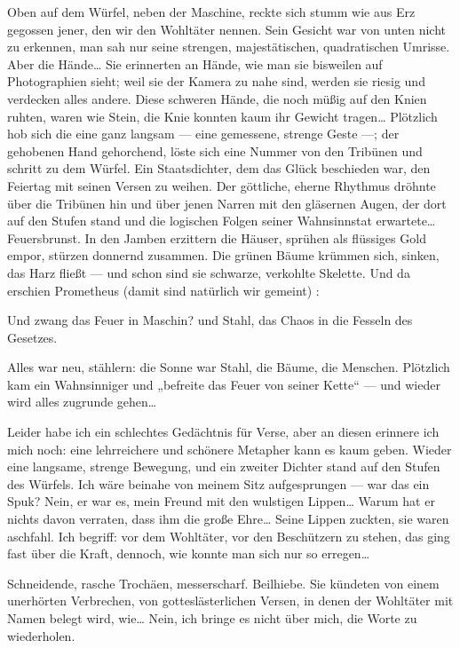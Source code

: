 Oben auf dem Würfel, neben der Maschine, reckte sich stumm wie aus
Erz gegossen jener, den wir den Wohltäter nennen. Sein Gesicht war
von unten nicht zu erkennen, man sah nur seine strengen,
majestätischen, quadratischen Umrisse. Aber die Hände\ldots{} Sie
erinnerten an Hände, wie man sie bisweilen auf Photographien sieht;
weil sie der Kamera zu nahe sind, werden sie riesig und verdecken
alles andere. Diese schweren Hände, die noch müßig auf den Knien
ruhten, waren wie Stein, die Knie konnten kaum ihr Gewicht
tragen\ldots{} Plötzlich hob sich die eine ganz langsam — eine
gemessene, strenge Geste —; der gehobenen Hand gehorchend, löste
sich eine Nummer von den Tribünen und schritt zu dem Würfel. Ein
Staatsdichter, dem das Glück beschieden war, den Feiertag mit
seinen Versen zu weihen. Der göttliche, eherne Rhythmus dröhnte
über die Tribünen hin und über jenen Narren mit den gläsernen
Augen, der dort auf den Stufen stand und die logischen Folgen
seiner Wahnsinnstat erwartete\ldots{} Feuersbrunst. In den Jamben
erzittern die Häuser, sprühen als flüssiges Gold empor, stürzen
donnernd zusammen. Die grünen Bäume krümmen sich, sinken, das Harz
fließt — und schon sind sie schwarze, verkohlte Skelette. Und da
erschien Prometheus (damit sind natürlich wir gemeint) :

Und zwang das Feuer in Maschin? und Stahl, das Chaos in die Fesseln
des Gesetzes.

Alles war neu, stählern: die Sonne war Stahl, die Bäume, die
Menschen. Plötzlich kam ein Wahnsinniger und „befreite das Feuer
von seiner Kette“ — und wieder wird alles zugrunde gehen\ldots{}

Leider habe ich ein schlechtes Gedächtnis für Verse, aber an diesen
erinnere ich mich noch: eine lehrreichere und schönere Metapher
kann es kaum geben. Wieder eine langsame, strenge Bewegung, und ein
zweiter Dichter stand auf den Stufen des Würfels. Ich wäre beinahe
von meinem Sitz aufgesprungen — war das ein Spuk? Nein, er war es,
mein Freund mit den wulstigen Lippen\ldots{} Warum hat er nichts davon
verraten, dass ihm die große Ehre\ldots{} Seine Lippen zuckten, sie
waren aschfahl. Ich begriff: vor dem Wohltäter, vor den Beschützern
zu stehen, das ging fast über die Kraft, dennoch, wie konnte man
sich nur so erregen\ldots{}

Schneidende, rasche Trochäen, messerscharf. Beilhiebe. Sie kündeten
von einem unerhörten Verbrechen, von gotteslästerlichen Versen, in
denen der Wohltäter mit Namen belegt wird, wie\ldots{} Nein, ich bringe
es nicht über mich, die Worte zu wiederholen.

